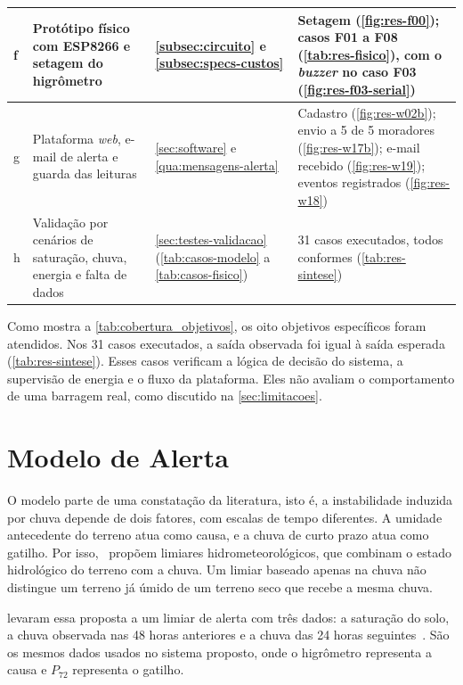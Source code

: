 \begin{table}[htb]
\begin{tabular}{p{}p{}p{}p{}}
\hline
f & Protótipo físico com ESP8266 e setagem do higrômetro &
\autoref{subsec:circuito} e \autoref{subsec:specs-custos} &
Setagem (\autoref{fig:res-f00}); casos F01 a F08
(\autoref{tab:res-fisico}), com o \textit{buzzer} no caso F03
(\autoref{fig:res-f03-serial}) \\
\hline
g & Plataforma \textit{web}, e-mail de alerta e guarda das leituras &
\autoref{sec:software} e \autoref{qua:mensagens-alerta} &
Cadastro (\autoref{fig:res-w02b}); envio a 5 de 5 moradores
(\autoref{fig:res-w17b}); e-mail recebido (\autoref{fig:res-w19});
eventos registrados (\autoref{fig:res-w18}) \\
\hline
h & Validação por cenários de saturação, chuva, energia e falta de dados &
\autoref{sec:testes-validacao} (\autoref{tab:casos-modelo} a
\autoref{tab:casos-fisico}) &
31 casos executados, todos conformes (\autoref{tab:res-sintese}) \\
\hline
\end{tabular}
\end{table}

Como mostra a \autoref{tab:cobertura_objetivos}, os oito objetivos
específicos foram atendidos. Nos 31 casos executados, a saída observada
foi igual à saída esperada (\autoref{tab:res-sintese}).
Esses casos verificam a lógica de decisão do sistema, a supervisão de
energia e o fluxo da plataforma. Eles não avaliam o comportamento de uma
barragem real, como discutido na \autoref{sec:limitacoes}.

\section{Modelo de Alerta}
\label{sec:disc-modelo}

O modelo parte de uma constatação da literatura, isto é, a instabilidade
induzida por chuva depende de dois fatores, com escalas de tempo
diferentes. A umidade antecedente do terreno atua como causa, e a chuva
de curto prazo atua como gatilho.
Por isso,~ propõem limiares
hidrometeorológicos, que combinam o estado hidrológico do terreno com a
chuva. Um limiar baseado apenas na chuva não distingue um terreno já
úmido de um terreno seco que recebe a mesma chuva.

 levaram essa proposta a um limiar de
alerta com três dados: a saturação do solo, a chuva observada nas 48
horas anteriores e a chuva das 24 horas seguintes~\cite[p.~5]{mirus2018developing}. São os mesmos dados usados no sistema proposto, onde o higrômetro representa a causa e $P_{72}$ representa o gatilho.

